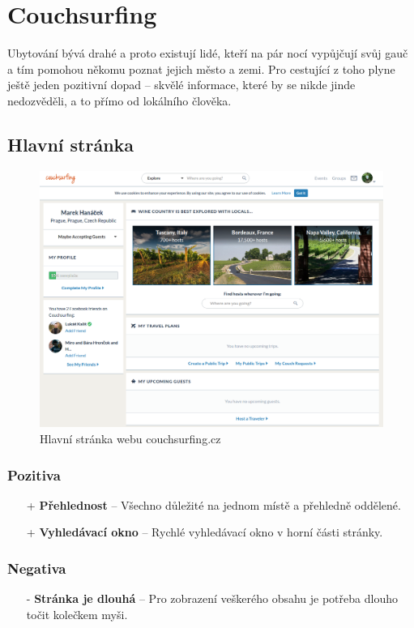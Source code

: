 \section{Couchsurfing}
\label{analyza:couchsurfing}

Ubytování bývá drahé a proto existují lidé, kteří na pár nocí vypůjčují svůj gauč a tím pomohou někomu poznat jejich město a zemi. Pro cestující z toho plyne ještě jeden pozitivní dopad -- skvělé informace, které by se nikde jinde nedozvěděli, a to přímo od lokálního člověka.\\

\subsection{Hlavní stránka}
\begin{figure}[h]
    \centering
    \includegraphics[width=1.0\textwidth]{media/couchsurfing/homepage.png}
    \caption{Hlavní stránka webu couchsurfing.cz}
    \label{fig:couchsurfing:homepage}
\end{figure}
\subsubsection*{Pozitiva}
\begin{itemize}
    \item[+] \textbf{Přehlednost} -- Všechno důležité na jednom místě a přehledně oddělené.
    \item[+] \textbf{Vyhledávací okno} -- Rychlé vyhledávací okno v horní části stránky.
\end{itemize}
\subsubsection*{Negativa}
\begin{itemize}
    \item[-] \textbf{Stránka je dlouhá} -- Pro zobrazení veškerého obsahu je potřeba dlouho točit kolečkem myši.
\end{itemize}


